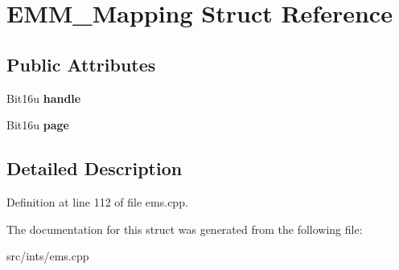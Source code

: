 \hypertarget{structEMM__Mapping}{\section{E\-M\-M\-\_\-\-Mapping Struct Reference}
\label{structEMM__Mapping}
}
\subsection*{Public Attributes}
\begin{DoxyCompactItemize}
\item 
\hypertarget{structEMM__Mapping_ad13a2505af53bc579fa4c22f16662352}{Bit16u {\bfseries handle}}\label{structEMM__Mapping_ad13a2505af53bc579fa4c22f16662352}

\item 
\hypertarget{structEMM__Mapping_a6baabf698f20e90db2a2c5ec18505237}{Bit16u {\bfseries page}}\label{structEMM__Mapping_a6baabf698f20e90db2a2c5ec18505237}

\end{DoxyCompactItemize}


\subsection{Detailed Description}


Definition at line 112 of file ems.\-cpp.



The documentation for this struct was generated from the following file\-:\begin{DoxyCompactItemize}
\item 
src/ints/ems.\-cpp\end{DoxyCompactItemize}

